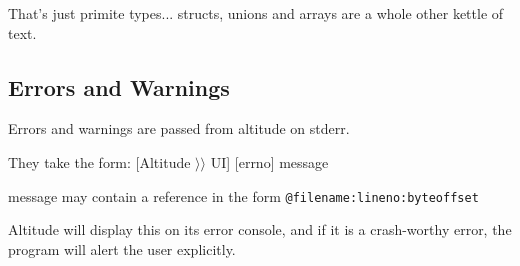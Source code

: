 \documentclass[10pt,a4paper]{report}
\begin{document}
That's just primite types... structs, unions and arrays are a whole other kettle of text.

\subsection{Errors and Warnings}

Errors and warnings are passed from altitude on stderr.

They take the form:
[Altitude $\rangle\rangle$ UI] [errno] message

message may contain a reference in the form \lstinline{@filename:lineno:byteoffset}


Altitude will display this on its error console, and if it is a crash-worthy error, the program will alert the user explicitly.
\end{document}
